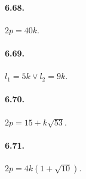 \begin{multicols}{2}
\paragraph{6.68.} $2p=40k$.

\paragraph{6.69.} $l_1=5k\vee l_2=9k$.

\paragraph{6.70.} $2p=15+k\sqrt{53}$.

\paragraph{6.71.} $2p=4k(1+\sqrt{10})$.
\end{multicols}
